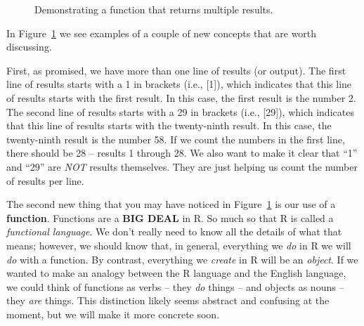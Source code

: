 \documentclass[
  letterpaper,
  DIV=11,
  numbers=noendperiod]{scrreprt}
\begin{document}
\begin{figure}


\caption{\label{fig-seq-function}Demonstrating a function that returns
multiple results.}

\end{figure}%

In Figure~\ref{fig-seq-function} we see examples of a couple of new
concepts that are worth discussing.

First, as promised, we have more than one line of results (or output).
The first line of results starts with a 1 in brackets (i.e., {[}1{]}),
which indicates that this line of results starts with the first result.
In this case, the first result is the number 2. The second line of
results starts with a 29 in brackets (i.e., {[}29{]}), which indicates
that this line of results starts with the twenty-ninth result. In this
case, the twenty-ninth result is the number 58. If we count the numbers
in the first line, there should be 28 -- results 1 through 28. We also
want to make it clear that ``1'' and ``29'' are \emph{NOT} results
themselves. They are just helping us count the number of results per
line.

The second new thing that you may have noticed in
Figure~\ref{fig-seq-function} is our use of a \textbf{function}.
Functions are a \textbf{BIG DEAL} in R. So much so that R is called a
\emph{functional language}. We don't really need to know all the details
of what that means; however, we should know that, in general, everything
we \emph{do} in R we will \emph{do} with a function. By contrast,
everything we \emph{create} in R will be an \emph{object}. If we wanted
to make an analogy between the R language and the English language, we
could think of functions as verbs -- they \emph{do} things -- and
objects as nouns -- they \emph{are} things. This distinction likely
seems abstract and confusing at the moment, but we will make it more
concrete soon.
\end{document}
